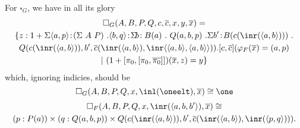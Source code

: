 \documentclass{article}
\begin{document}
For $\square_G$, we have in all its glory
\begin{multline*}
  \square_G(A, B, P, Q, c, \overline{c}, x, y, \overline{x}) = \\
  \{ z : 1 + \Sigma \langle a, p\rangle\!:\!(\Sigma\ A\ P)\ . \langle
  b, q\rangle\!:\! \Sigma\!b\!: B(a)\ .\ Q(a, b, p)\ . 
  \Sigma b'\!:\!B(c(\inr(\langle a, b\rangle)))\ . \\ Q(c(\inr(\langle a,
  b\rangle)), b', \overline{c}(\inr(\langle a, b\rangle),
  \inr\langle\langle a, b\rangle, \langle a, b\rangle\rangle)).  
  [c, \overline{c}](\varphi_F(\overline{x}) = (a, p) \\|\ (1 + [\pi_0, [\pi_0, \overline{\pi_0}]])(\overline{x}, z) = y \}
\end{multline*}
which, ignoring indicies, should be
\[
  \square_G(A, B, P, Q, x, \inl(\oneelt), \overline{x}) \cong \one
\]\vskip -1cm
\begin{multline*}
  \square_F(A, B, P, Q, x, \inr(\langle a, b, b'\rangle), \overline{x}) \cong \\
(p : P(a)) \times (q : Q(a, b, p)) \times Q(c(\inr(\langle a, b\rangle)), b', \overline{c}(\inr(\langle a, b\rangle), \inr(\langle p, q\rangle))).
\end{multline*}
\end{document}
